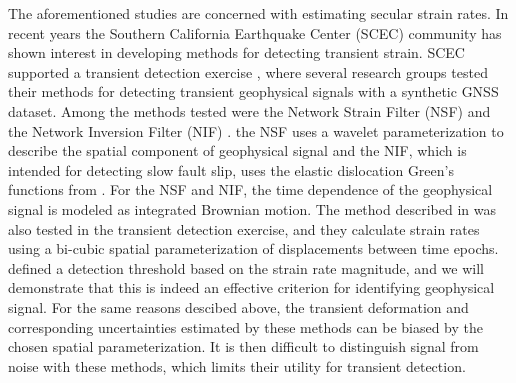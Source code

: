 \documentclass[10pt,letter]{article}
\begin{document}
The aforementioned studies are concerned with estimating secular strain rates. In recent years the Southern California Earthquake Center (SCEC) community has shown interest in developing methods for detecting transient strain. SCEC supported a transient detection exercise \citep{Lohman2013}, where several research groups tested their methods for detecting transient geophysical signals with a synthetic GNSS dataset. Among the methods tested were the Network Strain Filter (NSF) \citep{Ohtani2010} and the Network Inversion Filter (NIF) \citep{Segall1997}. the NSF uses a wavelet parameterization to  describe the spatial component of geophysical signal and the NIF, which is intended for detecting slow fault slip, uses the elastic dislocation Green's functions from \citet{Okada1992}. For the NSF and NIF, the time dependence of the geophysical signal is modeled as integrated Brownian motion. The method described in \citet{Holt2013} was also tested in the transient detection exercise, and they calculate strain rates using a bi-cubic spatial parameterization of displacements between time epochs. \citet{Holt2013} defined a detection threshold based on the strain rate magnitude, and we will demonstrate that this is indeed an effective criterion for identifying geophysical signal. For the same reasons descibed above, the transient deformation and corresponding uncertainties estimated by these methods can be biased by the chosen spatial parameterization. It is then difficult to distinguish signal from noise with these methods, which limits their utility for transient detection.   
\end{document}
